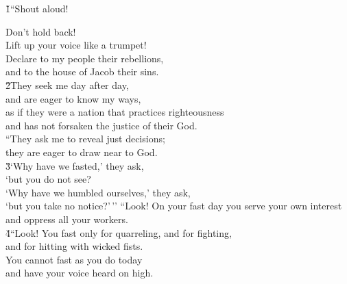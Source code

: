 \v{1}``Shout aloud!

\begin{poetry}
\poemll    Don't hold back! \\
\poemlll       Lift up your voice like a trumpet! \\
\poeml Declare to my people their rebellions, \\
\poemll    and to the house of Jacob their sins. \\
\poeml \v{2}They seek me day after day, \\
\poemll    and are eager to know my ways, \\
\poeml as if they were a nation that practices righteousness \\
\poemll    and has not forsaken the justice of their God. \\
\poeml ``They ask me to reveal just decisions; \\
\poemll    they are eager to draw near to God. \\
\poeml \v{3}`Why have we fasted,' they ask, \\
\poemll    `but you do not see? \\
\poeml `Why have we humbled ourselves,' they ask, \\
\poemll    `but you take no notice?'\,''
\poeml ``Look! On your fast day you serve your own interest \\
\poemll    and oppress all your workers. \\
\poeml \v{4}``Look! You fast only for quarreling, and for fighting, \\
\poemll    and for hitting with wicked fists. \\
\poeml You cannot fast as you do today \\
\poemll    and have your voice heard on high. \\

\end{poetry}
